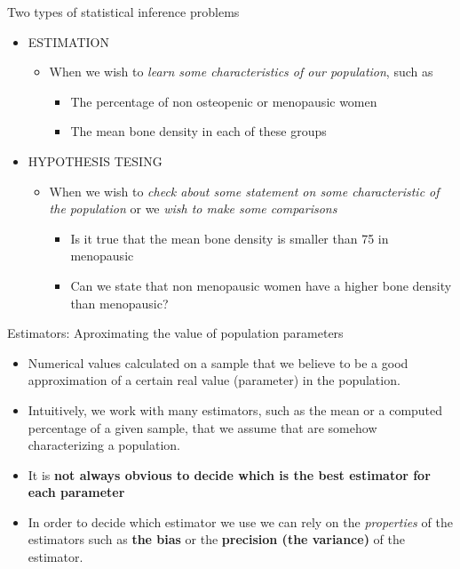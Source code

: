 \documentclass[
  ignorenonframetext,
]{beamer}
\providecommand{\tightlist}{%
  \setlength{\itemsep}{0pt}\setlength{\parskip}{0pt}}
\begin{document}
\begin{frame}{Two types of statistical inference problems}
\protect\hypertarget{two-types-of-statistical-inference-problems}{}
\begin{itemize}
\item
  ESTIMATION

  \begin{itemize}
  \tightlist
  \item
    When we wish to \emph{learn some characteristics of our population},
    such as

    \begin{itemize}
    \tightlist
    \item
      The percentage of non osteopenic or menopausic women
    \item
      The mean bone density in each of these groups
    \end{itemize}
  \end{itemize}
\item
  HYPOTHESIS TESING

  \begin{itemize}
  \tightlist
  \item
    When we wish to \emph{check about some statement on some
    characteristic of the population} or we \emph{wish to make some
    comparisons}

    \begin{itemize}
    \tightlist
    \item
      Is it true that the mean bone density is smaller than 75 in
      menopausic
    \item
      Can we state that non menopausic women have a higher bone density
      than menopausic?
    \end{itemize}
  \end{itemize}
\end{itemize}
\end{frame}

\begin{frame}{Estimators: Aproximating the value of population
parameters}
\protect\hypertarget{estimators-aproximating-the-value-of-population-parameters}{}
\begin{itemize}
\item
  Numerical values calculated on a sample that we believe to be a good
  approximation of a certain real value (parameter) in the population.
\item
  Intuitively, we work with many estimators, such as the mean or a
  computed percentage of a given sample, that we assume that are somehow
  characterizing a population.
\item
  It is \textbf{not always obvious to decide which is the best estimator
  for each parameter}
\item
  In order to decide which estimator we use we can rely on the
  \emph{properties} of the estimators such as \textbf{the bias} or the
  \textbf{precision (the variance)} of the estimator.
\end{itemize}
\end{frame}
\end{document}
